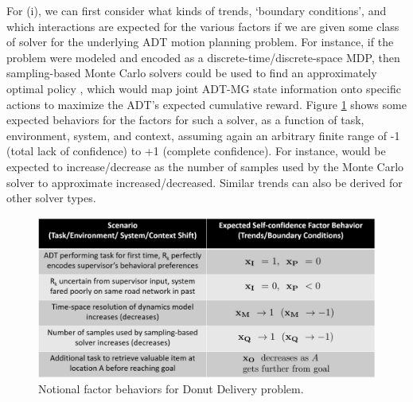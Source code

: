 For (i), we can first consider what kinds of trends, `boundary conditions', and which interactions are expected for the various factors if we are given some class of solver for the underlying ADT motion planning problem. For instance, if the problem were modeled and encoded as a discrete-time/discrete-space MDP, then sampling-based Monte Carlo solvers could be used to find an approximately optimal policy \policyopt{} \cite{Browne2012-lj}, which would map joint ADT-MG state information onto specific actions to maximize the ADT's expected cumulative reward. Figure \ref{fig:trendsBCs} shows some expected behaviors for the \famsec{} factors for such a solver, as a function of task, environment, system, and context, assuming again an arbitrary finite range of -1 (total lack of confidence) to +1 (complete confidence). For instance, \xQ{} would be expected to increase/decrease as the number of samples used by the Monte Carlo solver to approximate \policyopt{} increased/decreased. Similar trends can also be derived for other solver types.  %
\begin{figure}[tbp]
    \centering
    \includegraphics[width=0.65\linewidth]{Figures/scTrendsBoundaryExample_2generic.png}
    \caption{Notional \famsec{} factor behaviors for Donut Delivery problem.}
    \label{fig:trendsBCs}
\end{figure}


